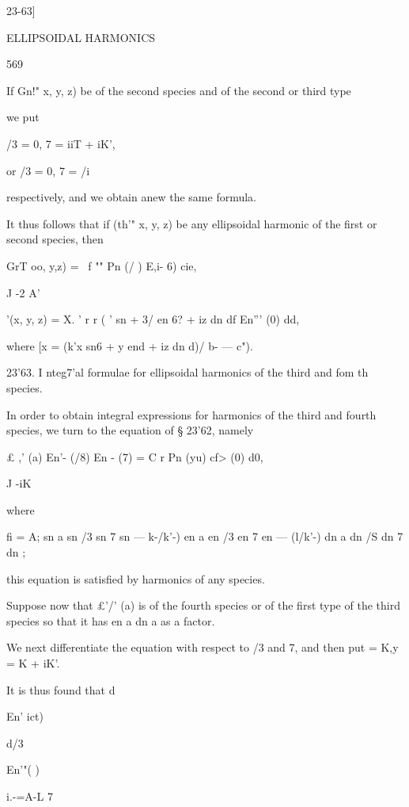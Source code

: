 {{{{{{{{23-63]



ELLIPSOIDAL HARMONICS



569



If Gn!" x, y, z) be of the second species and of the second or third
type

we put

/3 = 0, 7 = iiT + iK',

or /3 = 0, 7 = /i

respectively, and we obtain anew the same formula.

It thus follows that if (th'" x, y, z) be any ellipsoidal harmonic of
the first or second species, then

GrT oo, y,z) = \ f "" Pn (/ ) E,i- 6) cie,

J -2 A'

  '(x, y, z) = X. ' r r ( ' sn + 3/ en 6? + iz dn df En''' (0) dd,

where [x = (k'x sn6 + y end + iz dn d)/\/ b- — c").

23'63. I nteg7'al formulae for ellipsoidal harmonics of the third and
fom th species.

In order to obtain integral expressions for harmonics of the third and
fourth species, we turn to the equation of § 23'62, namely

£ ,' (a) En'- (/8) En - (7) = C r Pn (yu) cf> (0) d0,

J -iK

where

fi = A; sn a sn /3 sn 7 sn — k-/k'-) en a en /3 en 7 en — (l/k'-) dn a
dn /S dn 7 dn ;

this equation is satisfied by harmonics of any species.

Suppose now that £'/' (a) is of the fourth species or of the first
type of the third species so that it has en a dn a as a factor.

We next differentiate the equation with respect to /3 and 7, and then
put = K,y = K + iK'.

It is thus found that d



En' ict)



d/3



En'"( )



i.-=A-L 7



}}}}}}}}
